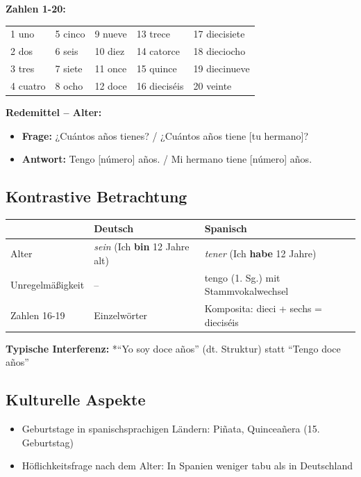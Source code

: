\documentclass[11pt,a4paper]{article}
\begin{document}
\textbf{Zahlen 1-20:}
\begin{center}
\begin{tabular}{|l|l|l|l|l|}
\hline
1 uno & 5 cinco & 9 nueve & 13 trece & 17 diecisiete \\
2 dos & 6 seis & 10 diez & 14 catorce & 18 dieciocho \\
3 tres & 7 siete & 11 once & 15 quince & 19 diecinueve \\
4 cuatro & 8 ocho & 12 doce & 16 dieciséis & 20 veinte \\
\hline
\end{tabular}
\end{center}

\textbf{Redemittel -- Alter:}
\begin{itemize}
    \item \textbf{Frage:} ¿Cuántos años tienes? / ¿Cuántos años tiene [tu hermano]?
    \item \textbf{Antwort:} Tengo [número] años. / Mi hermano tiene [número] años.
\end{itemize}

\subsection{Kontrastive Betrachtung}

\begin{tabular}{|l|p{5cm}|p{5cm}|}
\hline
& \textbf{Deutsch} & \textbf{Spanisch} \\
\hline
Alter & \textit{sein} (Ich \textbf{bin} 12 Jahre alt) & \textit{tener} (Ich \textbf{habe} 12 Jahre) \\
\hline
Unregelmäßigkeit & -- & tengo (1. Sg.) mit Stammvokalwechsel \\
\hline
Zahlen 16-19 & Einzelwörter & Komposita: dieci + sechs = dieciséis \\
\hline
\end{tabular}

\textbf{Typische Interferenz:} *``Yo soy doce años'' (dt. Struktur) statt ``Tengo doce años''

\subsection{Kulturelle Aspekte}
\begin{itemize}
    \item Geburtstage in spanischsprachigen Ländern: Piñata, Quinceañera (15. Geburtstag)
    \item Höflichkeitsfrage nach dem Alter: In Spanien weniger tabu als in Deutschland
\end{itemize}
\end{document}
